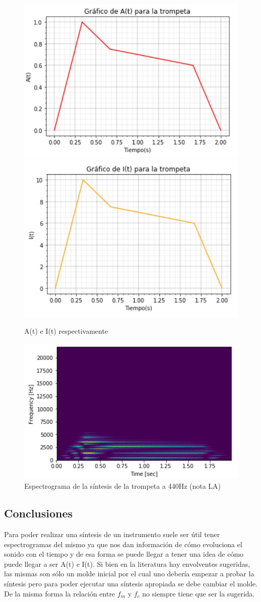 \documentclass[assd_tp2_main.tex]{subfiles}
\begin{document}
{\begin{figure}[H]
\centering
\includegraphics[width=0.4\linewidth]{graficos/EJ4/at_trompeta.png}
\includegraphics[width=0.4\linewidth]{graficos/EJ4/it_trompeta.png}
\caption{A(t) e I(t) respectivamente}
\label{fig:trombone_envelopes}
\end{figure}

\begin{figure}[H]
\centering
\includegraphics[width=0.4\linewidth]{graficos/EJ4/espectrograma_trompeta.png}
\caption{Espectrograma de la síntesis de la trompeta a 440Hz (nota LA)}
\label{fig:trombone_440}
\end{figure}

\subsection{Conclusiones}
Para poder realizar una síntesis de un instrumento suele ser útil tener espectrogramas del mismo ya que nos dan información de cómo evoluciona el sonido con el tiempo y de esa forma se puede llegar a tener una idea de cómo puede llegar a ser A(t) e I(t). Si bien en la literatura hay envolventes sugeridas, las mismas son sólo un molde inicial por el cual uno debería empezar a probar la síntesis pero para poder ejecutar una síntesis apropiada se debe cambiar el molde. De la misma forma la relación entre $f_m$ y $f_c$ no siempre tiene que ser la sugerida. 
\begin{thebibliography}{9}
  

\end{thebibliography}}
\end{document}
